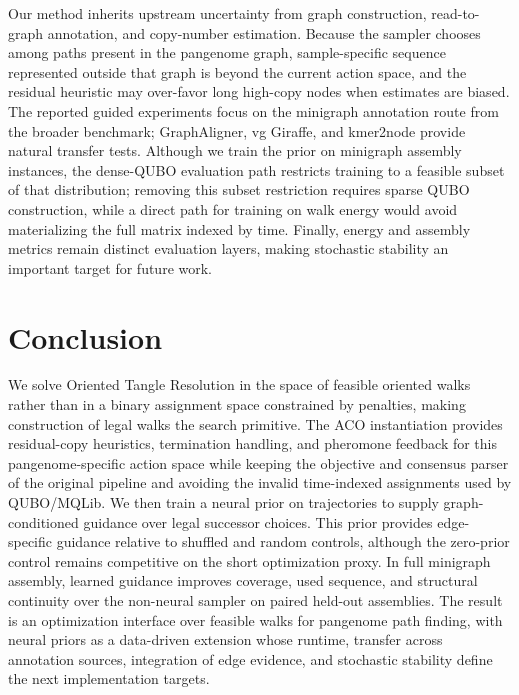 \documentclass[11pt]{article}
\begin{document}
Our method inherits upstream uncertainty from graph construction, read-to-graph annotation, and copy-number estimation. Because the sampler chooses among paths present in the pangenome graph, sample-specific sequence represented outside that graph is beyond the current action space, and the residual heuristic may over-favor long high-copy nodes when estimates are biased. The reported guided experiments focus on the minigraph annotation route from the broader benchmark; GraphAligner, vg Giraffe, and kmer2node provide natural transfer tests. Although we train the prior on minigraph assembly instances, the dense-QUBO evaluation path restricts training to a feasible subset of that distribution; removing this subset restriction requires sparse QUBO construction, while a direct path for training on walk energy would avoid materializing the full matrix indexed by time. Finally, energy and assembly metrics remain distinct evaluation layers, making stochastic stability an important target for future work.

\section{Conclusion}

We solve Oriented Tangle Resolution in the space of feasible oriented walks rather than in a binary assignment space constrained by penalties, making construction of legal walks the search primitive. The ACO instantiation provides residual-copy heuristics, termination handling, and pheromone feedback for this pangenome-specific action space while keeping the objective and consensus parser of the original pipeline and avoiding the invalid time-indexed assignments used by QUBO/MQLib. We then train a neural prior on trajectories to supply graph-conditioned guidance over legal successor choices. This prior provides edge-specific guidance relative to shuffled and random controls, although the zero-prior control remains competitive on the short optimization proxy. In full minigraph assembly, learned guidance improves coverage, used sequence, and structural continuity over the non-neural sampler on paired held-out assemblies. The result is an optimization interface over feasible walks for pangenome path finding, with neural priors as a data-driven extension whose runtime, transfer across annotation sources, integration of edge evidence, and stochastic stability define the next implementation targets.



\end{document}

